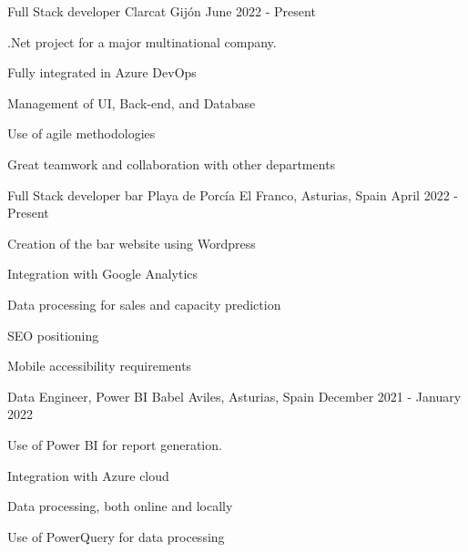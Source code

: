 
\begin{cventries}
    
\cventry
{Full Stack developer} %
{Clarcat} %
{Gijón} %
{June 2022 - Present} %
{
    \begin{cvitems} %
        \item {.Net project for a major multinational company.}
        \item {Fully integrated in Azure DevOps}
        \item {Management of UI, Back-end, and Database}
        \item {Use of agile methodologies}
        \item {Great teamwork and collaboration with other departments}
    \end{cvitems}
}
\cventry
{Full Stack developer} %
{bar Playa de Porcía} %
{El Franco, Asturias, Spain} %
{April 2022 - Present} %
{
    \begin{cvitems} %
        \item {Creation of the bar website using Wordpress}
        \item  {Integration with Google Analytics}
        \item {Data processing for sales and capacity prediction}
        \item {SEO positioning}
        \item {Mobile accessibility requirements}
    \end{cvitems}
}

\cventry
{Data Engineer, Power BI} %
{Babel} %
{Aviles, Asturias, Spain} %
{December 2021 - January 2022} %
{
    \begin{cvitems} %
        \item {Use of Power BI for report generation.}
        \item  {Integration with Azure cloud}
        \item {Data processing, both online and locally}
        \item {Use of PowerQuery for data processing}
    \end{cvitems}
}


\end{cventries}
